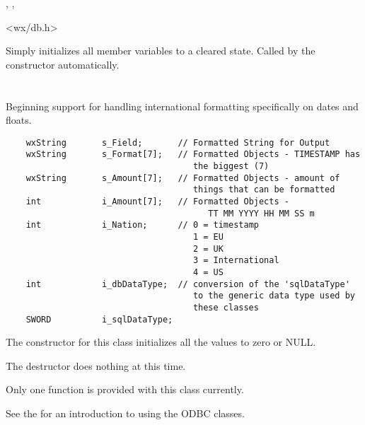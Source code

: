 
,
, 


<wx/db.h>


\label{wxdbcoldefinitialize}

Simply initializes all member variables to a cleared state.  Called by
the constructor automatically.

\section{}\label{wxdbcolfor}

Beginning support for handling international formatting specifically on dates
and floats.

\begin{verbatim}
    wxString       s_Field;       // Formatted String for Output
    wxString       s_Format[7];   // Formatted Objects - TIMESTAMP has
                                     the biggest (7)
    wxString       s_Amount[7];   // Formatted Objects - amount of
                                     things that can be formatted
    int            i_Amount[7];   // Formatted Objects -
                                        TT MM YYYY HH MM SS m
    int            i_Nation;      // 0 = timestamp
                                     1 = EU
                                     2 = UK
                                     3 = International
                                     4 = US
    int            i_dbDataType;  // conversion of the 'sqlDataType'
                                     to the generic data type used by
                                     these classes
    SWORD          i_sqlDataType;
\end{verbatim}

The constructor for this class initializes all the values to zero or NULL.

The destructor does nothing at this time.

Only one function is provided with this class currently.

See the  for
an introduction to using the ODBC classes.


